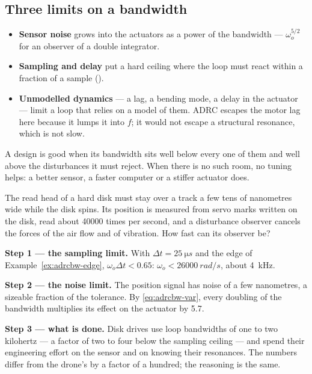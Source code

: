 \subsection{Three limits on a bandwidth}
\begin{itemize}
  \item \textbf{Sensor noise} grows into the actuators as a power of the bandwidth — $\omega_o^{5/2}$ for an observer of a double integrator.
  \item \textbf{Sampling and delay} put a hard ceiling where the loop must react within a fraction of a sample ().
  \item \textbf{Unmodelled dynamics} — a lag, a bending mode, a delay in the actuator — limit a loop that relies on a model of them. ADRC escapes the motor lag here because it lumps it into $f$; it would not escape a structural resonance, which is not slow.
\end{itemize}
A design is good when its bandwidth sits well below every one of them and well above the disturbances it must reject. When there is no such room, no tuning helps: a better sensor, a faster computer or a stiffer actuator does.

\begin{example}
\label{ex:adrcbw-hdd}
The read head of a hard disk must stay over a track a few tens of nanometres wide while the disk spins. Its position is measured from servo marks written on the disk, read about \num{40000} times per second, and a disturbance observer cancels the forces of the air flow and of vibration. How fast can its observer be?

\textbf{Step 1 — the sampling limit.} With $\Delta t = \SI{25}{\micro s}$ and the edge of Example~\ref{ex:adrcbw-edge}, $\omega_o\Delta t < 0.65$: $\omega_o < \SI{26000}{rad/s}$, about \SI{4}{kHz}.

\textbf{Step 2 — the noise limit.} The position signal has noise of a few nanometres, a sizeable fraction of the tolerance. By \cref{eq:adrcbw-var}, every doubling of the bandwidth multiplies its effect on the actuator by 5.7.

\textbf{Step 3 — what is done.} Disk drives use loop bandwidths of one to two kilohertz — a factor of two to four below the sampling ceiling — and spend their engineering effort on the sensor and on knowing their resonances. The numbers differ from the drone's by a factor of a hundred; the reasoning is the same.
\end{example}

